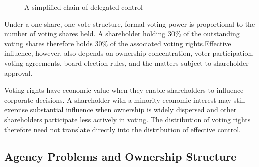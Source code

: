 \begin{figure}[htbp]
\centering


\caption{A simplified chain of delegated control}
\label{fig:ch9-governance-chain}
\end{figure}

Under a one-share, one-vote structure, formal voting
power is proportional to the number of voting shares
held. A shareholder holding 30\% of the
outstanding voting shares therefore holds 30\%
of the associated voting rights.Effective influence, however, also depends on ownership concentration, voter participation, voting agreements, board-election rules, and the matters subject to shareholder approval.

Voting rights have economic value when they enable
shareholders to influence corporate decisions.
A shareholder with a minority economic interest
may still exercise substantial influence when
ownership is widely dispersed and other shareholders
participate less actively in voting. The distribution
of voting rights therefore need not translate directly
into the distribution of effective control.

\subsection{Agency Problems and Ownership Structure}

